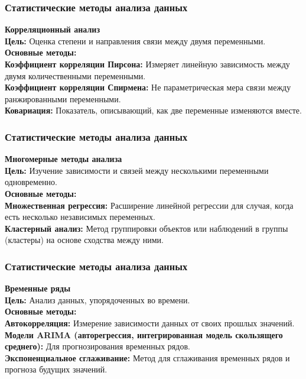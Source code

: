 \documentclass[aspectratio=169]{beamer}
\begin{document}
\begin{frame}
\frametitle{Статистические методы анализа данных}
\textbf{Корреляционный анализ}
\newline\\
\textbf{Цель:} Оценка степени и направления связи между двумя переменными.
\newline\\
\textbf{Основные методы:}
\newline\\
\textbf{Коэффициент корреляции Пирсона:} Измеряет линейную зависимость между двумя количественными переменными.
\newline\\
\textbf{Коэффициент корреляции Спирмена:} Не параметрическая мера связи между ранжированными переменными.
\newline\\
\textbf{Ковариация:} Показатель, описывающий, как две переменные изменяются вместе.
\end{frame}

\begin{frame}
\frametitle{Статистические методы анализа данных}
\textbf{Многомерные методы анализа}
\newline\\
\textbf{Цель:} Изучение зависимости и связей между несколькими переменными одновременно.
\newline\\
\textbf{Основные методы:}
\newline\\
\textbf{Множественная регрессия:} Расширение линейной регрессии для случая, когда есть несколько независимых переменных.
\newline\\
\textbf{Кластерный анализ:} Метод группировки объектов или наблюдений в группы (кластеры) на основе сходства между ними.
\end{frame}

\begin{frame}
\frametitle{Статистические методы анализа данных}
\textbf{Временные ряды}
\newline\\
\textbf{Цель:} Анализ данных, упорядоченных во времени.
\newline\\
\textbf{Основные методы:}
\newline\\
\textbf{Автокорреляция:} Измерение зависимости данных от своих прошлых значений.
\newline\\
\textbf{Модели ARIMA (авторегрессия, интегрированная модель скользящего среднего):} Для прогнозирования временных рядов.
\newline\\
\textbf{Экспоненциальное сглаживание:} Метод для сглаживания временных рядов и прогноза будущих значений.
\end{frame}
\end{document}
